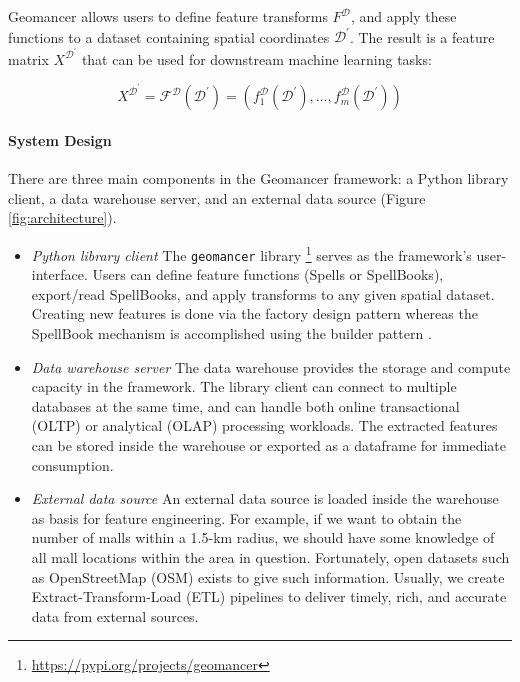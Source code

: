 \documentclass{article}
\begin{document}
Geomancer allows users to define feature transforms $F^{\mathcal{D}}$, and
apply these functions to a dataset containing spatial coordinates
$\mathcal{D}^{\prime}$. The result is a feature matrix $X^{\mathcal{D}^\prime}$
\cite{smith2017ballet} that can be used for downstream machine learning tasks: 

\begin{equation}
    X^{\mathcal{D}^\prime} = 
    \mathcal{F}^{\mathcal{D}}(\mathcal{D}^\prime) = 
    (f_{1}^{\mathcal{D}}(\mathcal{D}^\prime), \dots,
    f_{m}^{\mathcal{D}}(\mathcal{D}^\prime))
\end{equation}

\paragraph{System Design} There are three main components in the Geomancer
framework: a Python library client, a data warehouse server, and an external
data source (Figure \ref{fig:architecture}). 

\begin{itemize}
    \item \textit{Python library client} The \texttt{geomancer} library
        \footnote{\url{https://pypi.org/projects/geomancer}} serves as the
        framework's user-interface. Users can define feature functions
        (Spells or SpellBooks), export/read SpellBooks, and apply transforms to
        any given spatial dataset. Creating new features is done via the
        factory design pattern whereas the SpellBook mechanism is accomplished
        using the builder pattern \cite{gamma1995design}.
    \item \textit{Data warehouse server} The data warehouse provides the
        storage and compute capacity in the framework. The library client can
        connect to multiple databases at the same time, and can handle both
        online transactional (OLTP) or analytical (OLAP) processing workloads.
        The extracted features can be stored inside the warehouse or exported
        as a dataframe for immediate consumption.
    \item \textit{External data source} An external data source is loaded
        inside the warehouse as basis for feature engineering. For example, if
        we want to obtain the number of malls within a 1.5-km radius, we should
        have some knowledge of all mall locations within the area in question.
        Fortunately, open datasets such as OpenStreetMap (OSM) \cite{osm2017}
        exists to give such information. Usually, we create
        Extract-Transform-Load (ETL) pipelines to deliver timely, rich, and
        accurate data from external sources. 
\end{itemize}
\end{document}
